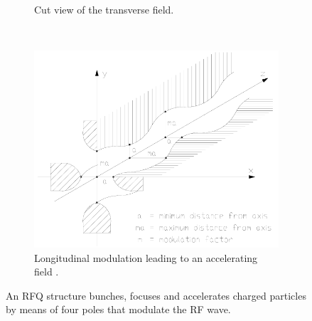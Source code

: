 \begin{figure}[!ht]
\begin{subfigure}[t]{.3\textwidth}
    \caption{Cut view of the transverse field.}
    \label{chap2:fig:RFQ_a}
  \end{subfigure}
  ~
  \begin{subfigure}[t]{0.3\textwidth}
    \includegraphics[width=\textwidth]{02_BeamDiag/figures/fig000_RFQ_b}
    \caption[Longitudinal modulation leading to an accelerating field]{Longitudinal modulation leading to an accelerating field \cite{Lombardi:1005049}.}
    \label{chap2:fig:RFQ_b}
  \end{subfigure}

  \caption[An RFQ structure bunches, focuses and accelerates charged particles by means of four poles that modulate the RF wave.]{An RFQ structure bunches, focuses and accelerates charged particles by means of four poles that modulate the RF wave.}
  \label{chap2:fig:RFQ}
\end{figure}
